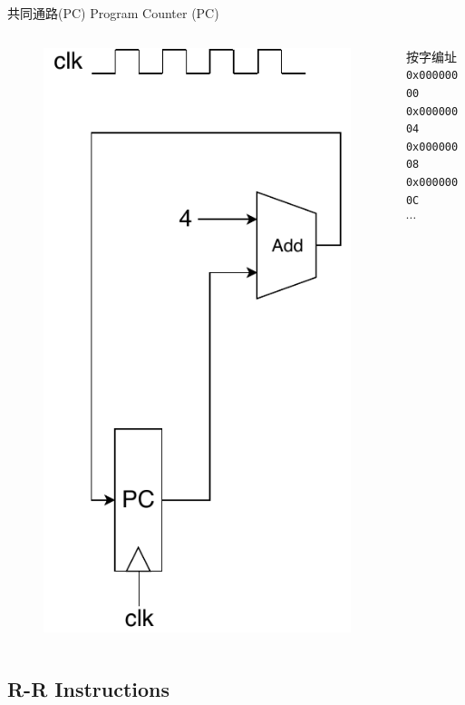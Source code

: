 \documentclass{myslide}
\begin{document}
\begin{frame}[fragile]{共同通路(PC)}
Program Counter (PC)
\begin{columns}
\begin{column}{0.5\linewidth}
\begin{figure}
\centering
\includegraphics[width=0.5\linewidth]{fig/Lecture2/Datapath-PC.pdf}
\end{figure}
\end{column}
\begin{column}{0.5\linewidth}
按字编址\\
\verb'0x00000000'\\
\verb'0x00000004'\\
\verb'0x00000008'\\
\verb'0x0000000C'\\
$\cdots$
\end{column}
\end{columns}
\end{frame}

\subsection{R-R Instructions}
\begin{frame}
\subsectionpage
\end{frame}
\end{document}
